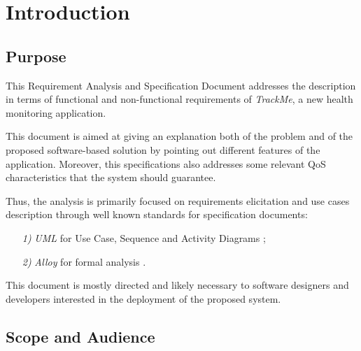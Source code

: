 \documentclass[a4paper]{article}
\begin{document}
\setlength{}{}

\tableofcontents
\newpage
{}
\renewcommand\listtablename{Use Cases Summary}
\listoftables
\newpage
{}
\renewcommand\listfigurename{UML Diagrams List}
\listoffigures
\newpage
{}
\newpage
\pagestyle{fancy}
\section{Introduction}

    \subsection{Purpose}
    This Requirement Analysis and Specification Document addresses the description in terms of functional and non-functional requirements of \textit{TrackMe}, a new health monitoring application.
    
    This document is aimed at giving an explanation both of the problem and of the proposed software-based solution by pointing out different features of the application. Moreover, this specifications also addresses some relevant QoS characteristics that the system should guarantee.
    
    Thus, the analysis is primarily focused on requirements elicitation and use cases description through well known standards for specification documents:
        \begin{itemize}
            \item[\textit{1)}] \textit{UML} for Use Case, Sequence and Activity Diagrams \cite{rumbaugh2004unified};
            \item[\textit{2)}] \textit{Alloy} for formal analysis \cite{jackson2006software}.
        \end{itemize}
        
    This document is mostly directed and likely necessary to software designers and developers interested in the deployment of the proposed system.
    
    \subsection{Scope and Audience}
\end{document}

